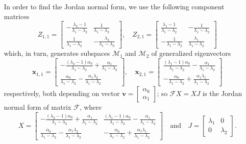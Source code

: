In order to find the Jordan normal form, we use the following component matrices
\begin{displaymath}
Z_{1,1} = \left[\begin{matrix}- \frac{\lambda_{2} - 1}{\lambda_{1} - \lambda_{2}} & \frac{1}{\lambda_{1} - \lambda_{2}}\\\frac{1}{\lambda_{1} - \lambda_{2}} & - \frac{\lambda_{2}}{\lambda_{1} - \lambda_{2}}\end{matrix}\right], \quad Z_{2,1} = \left[\begin{matrix}\frac{\lambda_{1} - 1}{\lambda_{1} - \lambda_{2}} & - \frac{1}{\lambda_{1} - \lambda_{2}}\\- \frac{1}{\lambda_{1} - \lambda_{2}} & \frac{\lambda_{1}}{\lambda_{1} - \lambda_{2}}\end{matrix}\right]
\end{displaymath}
which, in turn, generates subspaces $\mathcal{M}_{1}$ and $\mathcal{M}_{2}$ of
generalized eigenvectors
\begin{displaymath}
\boldsymbol{x}_{1,1} = \left[\begin{matrix}- \frac{\left(\lambda_{2} - 1\right) \alpha_{0}}{\lambda_{1} - \lambda_{2}} + \frac{\alpha_{1}}{\lambda_{1} - \lambda_{2}}\\\frac{\alpha_{0}}{\lambda_{1} - \lambda_{2}} - \frac{\alpha_{1} \lambda_{2}}{\lambda_{1} - \lambda_{2}}\end{matrix}\right], \quad \boldsymbol{x}_{2,1} = \left[\begin{matrix}\frac{\left(\lambda_{1} - 1\right) \alpha_{0}}{\lambda_{1} - \lambda_{2}} - \frac{\alpha_{1}}{\lambda_{1} - \lambda_{2}}\\- \frac{\alpha_{0}}{\lambda_{1} - \lambda_{2}} + \frac{\alpha_{1} \lambda_{1}}{\lambda_{1} - \lambda_{2}}\end{matrix}\right]
\end{displaymath}
respectively, both depending on vector $\boldsymbol{v} = \left[\begin{array}{c}\alpha_{0}\\\alpha_{1}\end{array}\right]$;
so $\mathcal{F}X=XJ$ is the Jordan normal form of matrix $\mathcal{F}$, where
\begin{displaymath}
X = \left[\begin{matrix}- \frac{\left(\lambda_{2} - 1\right) \alpha_{0}}{\lambda_{1} - \lambda_{2}} + \frac{\alpha_{1}}{\lambda_{1} - \lambda_{2}} & \frac{\left(\lambda_{1} - 1\right) \alpha_{0}}{\lambda_{1} - \lambda_{2}} - \frac{\alpha_{1}}{\lambda_{1} - \lambda_{2}}\\\frac{\alpha_{0}}{\lambda_{1} - \lambda_{2}} - \frac{\alpha_{1} \lambda_{2}}{\lambda_{1} - \lambda_{2}} & - \frac{\alpha_{0}}{\lambda_{1} - \lambda_{2}} + \frac{\alpha_{1} \lambda_{1}}{\lambda_{1} - \lambda_{2}}\end{matrix}\right]
\quad\text{and}\quad J = \left[\begin{matrix}\lambda_{1} & 0\\0 & \lambda_{2}\end{matrix}\right].
\end{displaymath}

